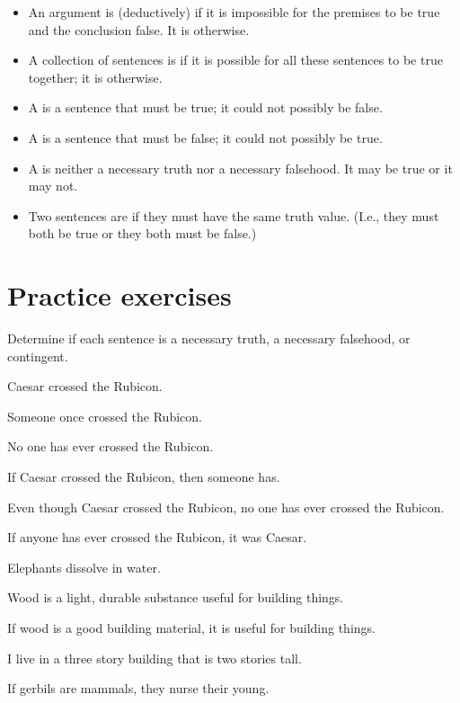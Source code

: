 \begin{itemize}
\item[] An argument is (deductively)  if it is impossible for the premises to be true and the conclusion false. It is  otherwise.

\item[] A collection of sentences is  if it is possible for all these sentences to be true together; it is  otherwise.

\item[] A  is a sentence that must be true; it could not possibly be false.

\item[] A  is a sentence that must be false; it could not possibly be true.

\item[] A  is neither a necessary truth nor a necessary falsehood. It may be true or it may not.

\item[] Two sentences are  if they must have the same truth value. (I.e., they must both be true or they both must be false.)
\end{itemize}


\section{Practice exercises}
\setcounter{ProbPart}{0}

\problempart
\label{pr.EnglishTautology2}
Determine if each sentence is a necessary truth, a necessary falsehood, or contingent.
\begin{earg}
\item Caesar crossed the Rubicon.
\item Someone once crossed the Rubicon.
\item No one has ever crossed the Rubicon.
\item If Caesar crossed the Rubicon, then someone has.
\item Even though Caesar crossed the Rubicon, no one has ever crossed the Rubicon.
\item If anyone has ever crossed the Rubicon, it was Caesar.

\item Elephants dissolve in water.
\item Wood is a light, durable substance useful for building things.
\item If wood is a good building material, it is useful for building things.
\item I live in a three story building that is two stories tall.
\item If gerbils are mammals, they nurse their young.
\end{earg}

